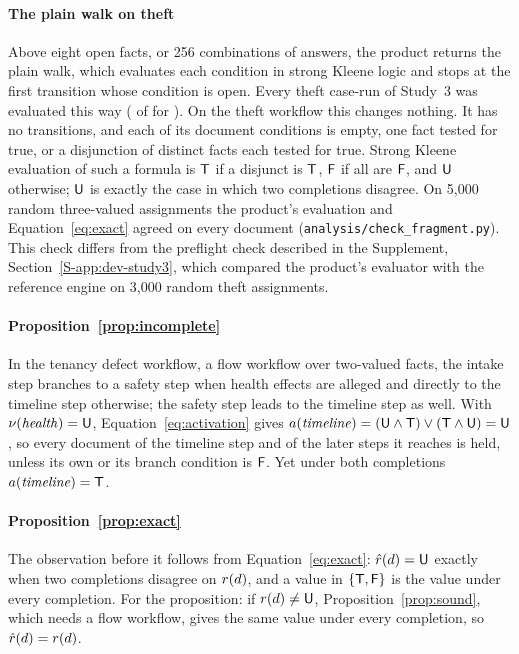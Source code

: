 \paragraph{The plain walk on theft}
Above eight open facts, or 256 combinations of answers, the product returns the plain walk, which evaluates each condition in strong Kleene logic and stops at the first transition whose condition is open. Every theft case-run of Study~3 was evaluated this way (\sthreeDeferralCasePathThPlainWalk{} of \sthreeDeferralCasePathThCaseRuns{} for \casepath). On the theft workflow this changes nothing. It has no transitions, and each of its document conditions is empty, one fact tested for true, or a disjunction of distinct facts each tested for true. Strong Kleene evaluation of such a formula is $\mathsf{T}$ if a disjunct is $\mathsf{T}$, $\mathsf{F}$ if all are $\mathsf{F}$, and $\mathsf{U}$ otherwise; $\mathsf{U}$ is exactly the case in which two completions disagree. On 5,000 random three-valued assignments the product's evaluation and Equation~\eqref{eq:exact} agreed on every document (\texttt{analysis/\allowbreak{}check\_fragment.py}). This check differs from the preflight check described in the Supplement, Section~\ref{S-app:dev-study3}, which compared the product's evaluator with the reference engine on 3,000 random theft assignments.

\paragraph{Proposition~\ref{prop:incomplete}}
In the tenancy defect workflow, a flow workflow over two-valued facts, the intake step branches to a safety step when health effects are alleged and directly to the timeline step otherwise; the safety step leads to the timeline step as well. With $\nu(\mathit{health})=\mathsf{U}$, Equation~\eqref{eq:activation} gives $a(\mathit{timeline})=(\mathsf{U}\wedge\mathsf{T})\vee(\mathsf{T}\wedge\mathsf{U})=\mathsf{U}$, so every document of the timeline step and of the later steps it reaches is held, unless its own or its branch condition is $\mathsf{F}$. Yet under both completions $a(\mathit{timeline})=\mathsf{T}$.

\paragraph{Proposition~\ref{prop:exact}}
The observation before it follows from Equation~\eqref{eq:exact}: $\hat r(d)=\mathsf{U}$ exactly when two completions disagree on $r(d)$, and a value in $\{\mathsf{T},\mathsf{F}\}$ is the value under every completion. For the proposition: if $r(d)\neq\mathsf{U}$, Proposition~\ref{prop:sound}, which needs a flow workflow, gives the same value under every completion, so $\hat r(d)=r(d)$.

